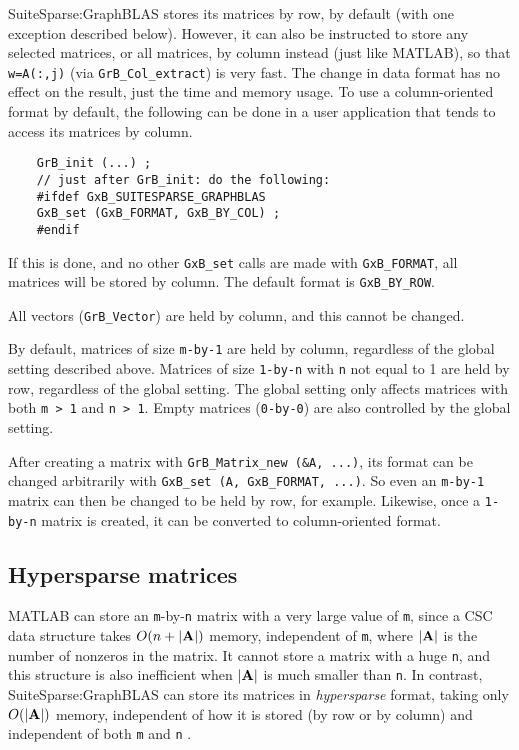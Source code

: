 \documentclass[12pt]{article}
\begin{document}
{SuiteSparse:GraphBLAS stores its matrices by row, by default (with one
exception described below).  However, it can also be instructed to store any
selected matrices, or all matrices, by column instead (just like MATLAB), so
that \verb'w=A(:,j)' (via \verb'GrB_Col_extract') is very fast.  The change in
data format has no effect on the result, just the time and memory usage.  To
use a column-oriented format by default, the following can be done in a user
application that tends to access its matrices by column.

    {\footnotesize
    \begin{verbatim}
    GrB_init (...) ;
    // just after GrB_init: do the following:
    #ifdef GxB_SUITESPARSE_GRAPHBLAS
    GxB_set (GxB_FORMAT, GxB_BY_COL) ;
    #endif \end{verbatim} }

If this is done, and no other \verb'GxB_set' calls are made with
\verb'GxB_FORMAT', all matrices will be stored by column.
The default format is \verb'GxB_BY_ROW'.

All vectors (\verb'GrB_Vector') are held by column, and this cannot be changed.

By default, matrices of size \verb'm-by-1' are held by column, regardless of
the global setting described above.  Matrices of size \verb'1-by-n' with
\verb'n' not equal to 1 are held by row, regardless of the global setting.
The global setting only affects matrices with both \verb'm > 1' and \verb'n > 1'.
Empty matrices (\verb'0-by-0') are also controlled by the global setting.

After creating a matrix with \verb'GrB_Matrix_new (&A, ...)',
its format can be changed arbitrarily with \verb'GxB_set (A, GxB_FORMAT, ...)'.
So even an \verb'm-by-1' matrix can then be changed to be held by row, for
example.  Likewise, once a \verb'1-by-n' matrix is created, it can be converted
to column-oriented format.

\subsection{Hypersparse matrices}
\label{hypersparse}

MATLAB can store an \verb'm'-by-\verb'n' matrix with a very large value of
\verb'm', since a CSC data structure takes $O(n+|{\bf A}|)$ memory, independent
of \verb'm', where $|{\bf A}|$ is the number of nonzeros in the matrix.  It
cannot store a matrix with a huge \verb'n', and this structure is also
inefficient when $|{\bf A}|$ is much smaller than \verb'n'.  In contrast,
SuiteSparse:GraphBLAS can store its matrices in {\em hypersparse} format,
taking only $O(|{\bf A}|)$ memory, independent of how it is stored (by row or
by column) and independent of both \verb'm' and \verb'n'
\cite{BulucGilbert08,BulucGilbert12}.

}
\end{document}
